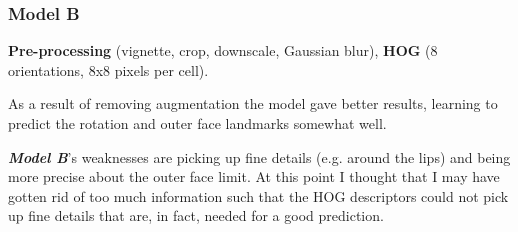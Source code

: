 \documentclass{article}
\begin{document}
\subsubsection{Model B}
\textbf{Pre-processing} (vignette, crop, downscale, Gaussian blur), \textbf{HOG} (8 orientations, 8x8 pixels per cell).

As a result of removing augmentation the model gave better results, learning to predict the rotation and outer face landmarks somewhat well.

\textbf{\textit{Model B}}'s weaknesses are picking up fine details (e.g. around the lips) and being more precise about the outer face limit. At this point I thought that I may have gotten rid of too much information such that the HOG descriptors could not pick up fine details that are, in fact, needed for a good prediction.
\end{document}
